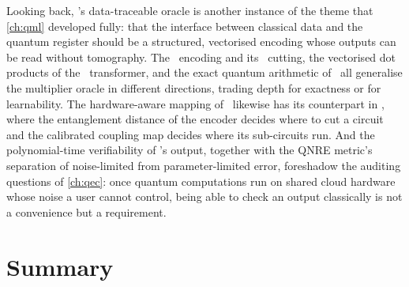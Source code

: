 Looking back, \qawa's data-traceable oracle is another instance of the theme that \cref{ch:qml} developed fully: that the interface between classical data and the quantum register should be a structured, vectorised encoding whose outputs can be read without tomography. The \qcrank\ encoding and its \shardq\ cutting, the vectorised dot products of the \vqt\ transformer, and the exact quantum arithmetic of \nnqa\ all generalise the multiplier oracle in different directions, trading depth for exactness or for learnability. The hardware-aware mapping of \deal\ likewise has its counterpart in \shardq, where the entanglement distance of the encoder decides where to cut a circuit and the calibrated coupling map decides where its sub-circuits run. And the polynomial-time verifiability of \qawa's output, together with the QNRE metric's separation of noise-limited from parameter-limited error, foreshadow the auditing questions of \cref{ch:qec}: once quantum computations run on shared cloud hardware whose noise a user cannot control, being able to check an output classically is not a convenience but a requirement.

\section{Summary}\label{sec:nisq:summary}

